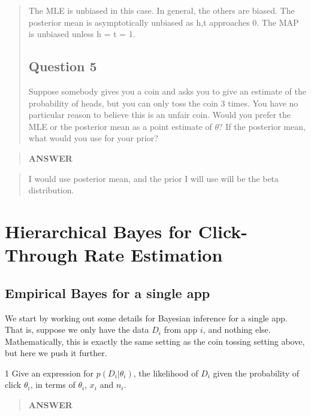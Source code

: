 \documentclass[11pt]{article}
\begin{document}
\begin{quote}

The MLE is unbiased in this case. In general, the others are biased. The
posterior mean is asymptotically unbiased as h,t approaches 0. The MAP is unbiased unless h = t = 1.
    \subsection{Question 5}\label{question-5}

Suppose somebody gives you a coin and asks you to give an estimate of
the probability of heads, but you can only toss the coin 3 times. You
have no particular reason to believe this is an unfair coin. Would you
prefer the MLE or the posterior mean as a point estimate of \(\theta\)?
If the posterior mean, what would you use for your prior?
\end{quote}

    \begin{quote}
\textbf{ANSWER}
\end{quote}

\begin{quote}
I would use posterior mean, and the prior I will use will be the beta
distribution.
\end{quote}

\clearpage


    \section{Hierarchical Bayes for Click-Through Rate
Estimation}\label{hierarchical-bayes-for-click-through-rate-estimation}

    \subsection{Empirical Bayes for a single
app}\label{empirical-bayes-for-a-single-app}

We start by working out some details for Bayesian inference for a single
app. That is, suppose we only have the data \(D_i\) from app \(i\), and
nothing else. Mathematically, this is exactly the same setting as the
coin tossing setting above, but here we push it further.

    1 Give an expression for \(p(D_i|\theta_i)\), the likelihood of \(D_i\)
given the probability of click \(\theta_i\), in terms of \(\theta_i\),
\(x_i\) and \(n_i\).

    \begin{quote}
\textbf{ANSWER}
\end{quote}
\end{document}
